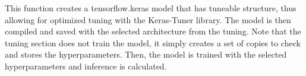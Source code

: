 This function creates a tensorflow.keras model that has tuneable structure, thus allowing for optimized tuning with the Keras-Tuner 
library\cite{omalley2019kerastuner}. The model is then compiled and saved with the selected architecture from the tuning. 
Note that the tuning section does not train the model, it simply creates a set of copies to check and stores the hyperparameters. 
Then, the model is trained with the selected hyperparameters and inference is calculated. 